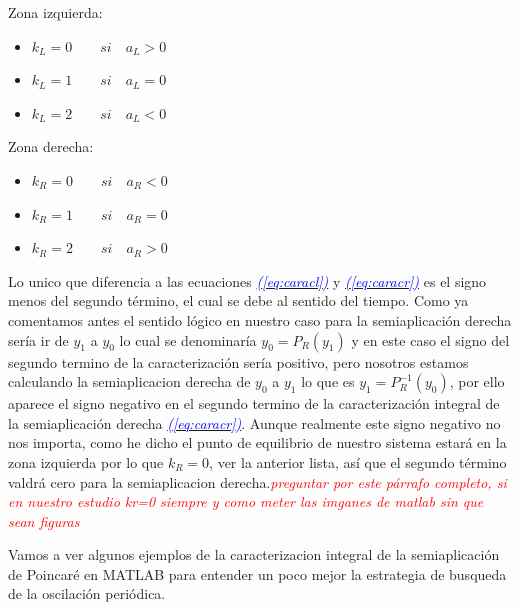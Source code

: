 \documentclass[12pt,a4paper]{report} %
\newcommand{\eref}[1]{\hyperref[#1]{\textcolor{blue}{\textit{(\ref*{#1})}}}}
\begin{document}
	\vspace{0.5cm}\noindent Zona izquierda:
	\begin{itemize}
		\item $k_L=0 \qquad si \quad a_L>0$
		\item $k_L=1 \qquad si \quad a_L=0$
		\item $k_L=2 \qquad si \quad a_L<0$
	\end{itemize}\smallskip
	
		\noindent Zona derecha:
	\begin{itemize}
		\item $k_R=0 \qquad si \quad a_R<0$
		\item $k_R=1 \qquad si \quad a_R=0$
		\item $k_R=2 \qquad si \quad a_R>0$
	\end{itemize}\smallskip
	\newpage
	
	Lo unico que diferencia a las ecuaciones \eref{eq:caracl} y \eref{eq:caracr} es el signo menos del segundo término, el cual se debe al sentido del tiempo. Como ya comentamos antes el sentido lógico en nuestro caso para la semiaplicación derecha sería ir de $y_1$ a $y_0$ lo cual se denominaría $y_0=P_R(y_1)$ y en este caso el signo del segundo termino de la caracterización sería positivo, pero nosotros estamos calculando la semiaplicacion derecha de $y_0$ a $y_1$ lo que es $y_1=P_R^{-1}(y_0)$, por ello aparece el signo negativo en el segundo termino de la caracterización integral de la semiaplicación derecha \eref{eq:caracr}. Aunque realmente este signo negativo no nos importa, como he dicho el punto de equilibrio de nuestro sistema estará en la zona izquierda por lo que $k_R=0$, ver la anterior lista, así que el segundo término valdrá cero para la semiaplicacion derecha.\textit{\textcolor{red}{preguntar por este párrafo completo, si en nuestro estudio kr=0 siempre y como meter las imganes de matlab sin que sean figuras}}
	
	\vspace{0.5cm} Vamos a ver algunos ejemplos de la caracterizacion integral de la semiaplicación de Poincaré en MATLAB para entender un poco mejor la estrategia de busqueda de la oscilación periódica.
	
\end{document}
